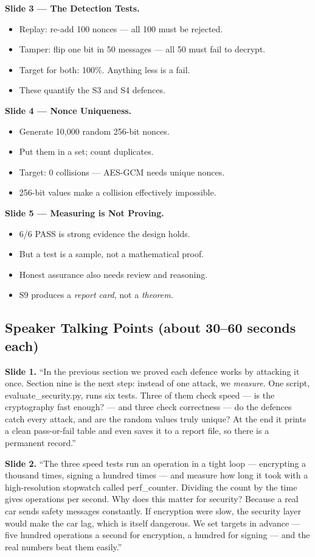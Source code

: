 \documentclass[11pt,a4paper]{article}
\begin{document}
\textbf{Slide 3 --- The Detection Tests.}
\begin{itemize}
  \item Replay: re-add 100 nonces --- all 100 must be rejected.
  \item Tamper: flip one bit in 50 messages --- all 50 must fail to decrypt.
  \item Target for both: 100\%. Anything less is a fail.
  \item These quantify the S3 and S4 defences.
\end{itemize}

\textbf{Slide 4 --- Nonce Uniqueness.}
\begin{itemize}
  \item Generate 10{,}000 random 256-bit nonces.
  \item Put them in a set; count duplicates.
  \item Target: 0 collisions --- AES-GCM needs unique nonces.
  \item 256-bit values make a collision effectively impossible.
\end{itemize}

\textbf{Slide 5 --- Measuring is Not Proving.}
\begin{itemize}
  \item 6/6 PASS is strong evidence the design holds.
  \item But a test is a sample, not a mathematical proof.
  \item Honest assurance also needs review and reasoning.
  \item S9 produces a \emph{report card}, not a \emph{theorem}.
\end{itemize}

\subsection{Speaker Talking Points (about 30--60 seconds each)}

\textbf{Slide 1.} ``In the previous section we proved each defence works by
attacking it once. Section nine is the next step: instead of one attack, we
\emph{measure}. One script, evaluate\_security.py, runs six tests. Three of them
check speed --- is the cryptography fast enough? --- and three check correctness
--- do the defences catch every attack, and are the random values truly unique?
At the end it prints a clean pass-or-fail table and even saves it to a report
file, so there is a permanent record.''

\textbf{Slide 2.} ``The three speed tests run an operation in a tight loop ---
encrypting a thousand times, signing a hundred times --- and measure how long it
took with a high-resolution stopwatch called perf\_counter. Dividing the count by
the time gives operations per second. Why does this matter for security? Because
a real car sends safety messages constantly. If encryption were slow, the
security layer would make the car lag, which is itself dangerous. We set targets
in advance --- five hundred operations a second for encryption, a hundred for
signing --- and the real numbers beat them easily.''
\end{document}

